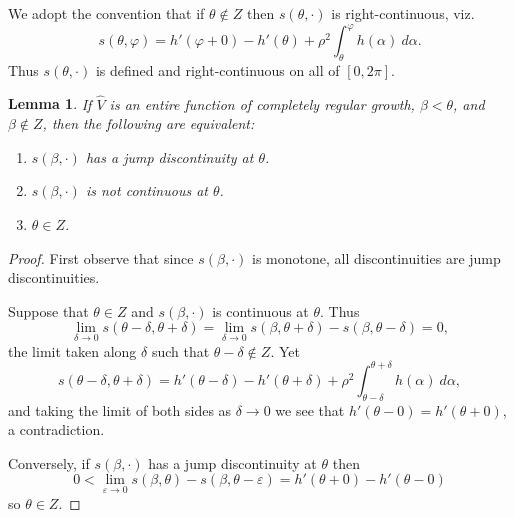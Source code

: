 \documentclass[reqno,12pt,letterpaper]{amsart}
\newtheorem{lemma}[theorem]{Lemma}
\theoremstyle{definition}
\begin{document}
We adopt the convention that if $\theta \notin Z$ then $s(\theta, \cdot)$ is right-continuous, viz.
$$s(\theta, \varphi) = h'(\varphi + 0) - h'(\theta) + \rho^2\int_\theta^\varphi h(\alpha)~d\alpha.$$
Thus $s(\theta, \cdot)$ is defined and right-continuous on all of $[0, 2\pi]$.

\begin{lemma}
\label{characterizing jump discontinuity}
If $\widehat V$ is an entire function of completely regular growth, $\beta < \theta$, and $\beta \notin Z$, then the following are equivalent:
\begin{enumerate}
\item $s(\beta, \cdot)$ has a jump discontinuity at $\theta$.
\item $s(\beta, \cdot)$ is not continuous at $\theta$.
\item $\theta \in Z$.
\end{enumerate}
\end{lemma}
\begin{proof}
First observe that since $s(\beta, \cdot)$ is monotone, all discontinuities are jump discontinuities.

Suppose that $\theta \in Z$ and $s(\beta, \cdot)$ is continuous at $\theta$.
Thus
$$\lim_{\delta \to 0} s(\theta - \delta, \theta + \delta) = \lim_{\delta \to 0} s(\beta, \theta + \delta) - s(\beta, \theta - \delta) = 0,$$
the limit taken along $\delta$ such that $\theta - \delta \notin Z$. Yet
$$s(\theta - \delta, \theta + \delta) = h'(\theta - \delta) - h'(\theta + \delta) + \rho^2 \int_{\theta - \delta}^{\theta + \delta} h(\alpha)~d\alpha,$$
and taking the limit of both sides as $\delta \to 0$ we see that $h'(\theta - 0) = h'(\theta + 0)$, a contradiction.

Conversely, if $s(\beta, \cdot)$ has a jump discontinuity at $\theta$ then
$$0 < \lim_{\varepsilon \to 0} s(\beta, \theta) - s(\beta, \theta - \varepsilon) = h'(\theta + 0) - h'(\theta - 0)$$
so $\theta \in Z$.
\end{proof}
\end{document}
